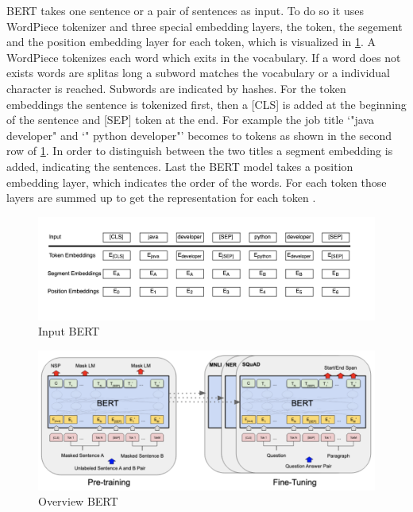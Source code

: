 \documentclass[12pt, a4paper, titlepage]{article}
\begin{document}
\ac{BERT} takes one sentence or a pair of sentences as input. To do so it uses WordPiece tokenizer and three special embedding layers, the token, the segement and the position embedding layer for each token, which is visualized in \ref{fig: F4}. A WordPiece tokenizes each word which exits in the vocabulary. If a word does not exists words are splitas long a subword matches the vocabulary or a individual character is reached. Subwords are indicated by hashes. For the token embeddings the sentence is tokenized first, then a [CLS] is added at the beginning of the sentence and [SEP] token at the end. For example the job title `"java developer" and `" python developer"' becomes to tokens as shown in the second row of \ref{fig: F4}. In order to distinguish between the two titles a segment embedding is added, indicating the sentences. Last the \ac{BERT} model takes a position embedding layer, which indicates the order of the words. For each token those layers are summed up to get the representation for each token \citep{devlin2018,ravichandiran2021}.

\begin{figure}[hb!]
  \center
  \includegraphics[scale=0.5]{BERTInput_own.png}
  \caption{\label{fig: F4} Input \ac{BERT} \citep[5]{devlin2018}}
\end{figure}

\begin{figure}[hb!]
  \center
  \includegraphics[scale=0.5]{BERTOverview.png}
  \caption{\label{fig: F3} Overview \ac{BERT} \citep[3]{devlin2018}}
\end{figure}
\end{document}
